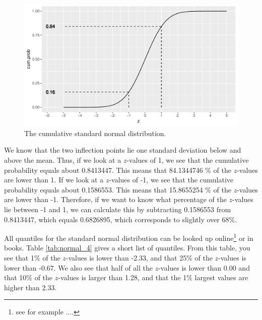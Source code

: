\documentclass[]{report}\usepackage[]{graphicx}\usepackage[]{color}
\makeatletter
\def\maxwidth{ %
  \ifdim\Gin@nat@width>\linewidth
    \linewidth
  \else
    \Gin@nat@width
  \fi
}
\newenvironment{knitrout}{}{} %
\makeatother
\begin{document}
\begin{knitrout}
\color{fgcolor}\begin{figure}

{\centering \includegraphics[width=\maxwidth]{figure/normal_3-1} 

}

\caption[The cumulative standard normal distribution]{The cumulative standard normal distribution.}\label{fig:normal_3}
\end{figure}


\end{knitrout}

We know that the two inflection points lie one standard deviation below and above the mean. Thus, if we look at a $z$-values of 1, we see that the cumulative probability equals about 0.8413447. This means that 84.1344746 \% of the $z$-values are lower than 1. If we look at a $z$-values of -1, we see that the cumulative probability equals about 0.1586553. This means that 15.8655254 \% of the $z$-values are lower than -1. Therefore, if we want to know what percentage of the $z$-values lie between -1 and 1, we can calculate this by subtracting 0.1586553 from 0.8413447, which equals 0.6826895, which corresponds to slightly over 68\%.

All quantiles for the standard normal distribution can be looked up online\footnote{see for example ....} or in books. Table \ref{tab:normal_4} gives a short list of quantiles. From this table, you see that 1\% of the $z$-values is lower than -2.33, and that 25\% of the $z$-values is lower than -0.67. We also see that half of all the $z$-values is lower than 0.00 and that 10\% of the $z$-values is larger than 1.28, and that the 1\% largest values are higher than 2.33.
\end{document}
